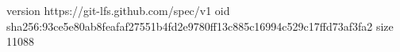 version https://git-lfs.github.com/spec/v1
oid sha256:93ce5e80ab8feafaf27551b4fd2e9780ff13c885c16994c529c17ffd73af3fa2
size 11088

